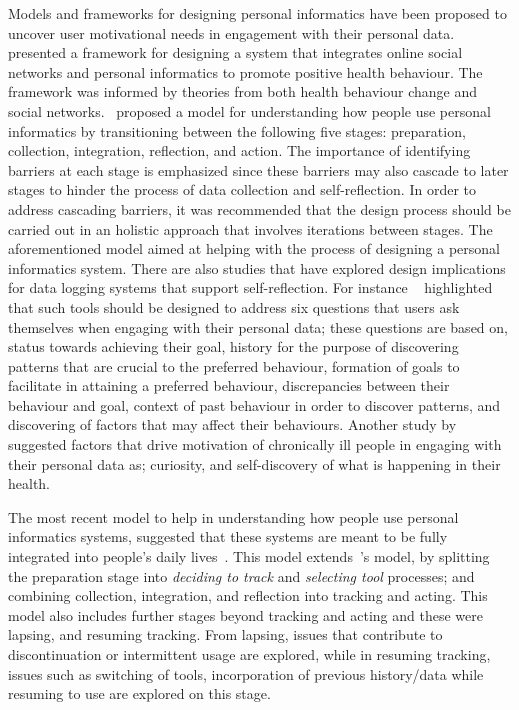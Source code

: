 Models and frameworks for designing personal informatics have been proposed to uncover user motivational needs in engagement with their personal data.~\cite{kamal2010understanding} presented a framework for designing a system that integrates online social networks and personal informatics to promote positive health behaviour. The framework was informed by theories from both health behaviour change and social networks.~\cite{li2010stage} proposed a model for understanding how people use personal informatics by transitioning between the following five stages: preparation, collection, integration, reflection, and action. The importance of identifying barriers at each stage is emphasized since these barriers may also cascade to later stages to hinder the process of data collection and self-reflection. In order to address cascading barriers, it was recommended that the design process should be carried out in an holistic approach that involves iterations between stages. The aforementioned model aimed at helping with the process of designing a personal informatics system. There are also studies that have explored design implications for data logging systems that support self-reflection. For instance ~\cite{li2011understanding} highlighted that such tools should be designed to address six questions that users ask themselves when engaging with their personal data; these questions are based on, status towards achieving their goal, history for the purpose of discovering patterns that are crucial to the preferred behaviour, formation of goals to facilitate in attaining a preferred behaviour, discrepancies between their behaviour and goal, context of past behaviour in order to discover patterns, and discovering of factors that may affect their behaviours. Another study by~\cite{macleod2013personal} suggested factors that drive motivation of chronically ill people in engaging with their personal data as; curiosity, and self-discovery of what is happening in their health.

The most recent model to help in understanding how people use personal informatics systems, suggested that these systems are meant to be fully integrated into people's daily lives~\citep{epstein2015lived}. This model extends~\cite{li2010stage}'s model, by splitting the preparation stage into \emph{deciding to track} and \emph{selecting tool} processes; and combining collection, integration, and reflection into tracking and acting. This model also includes further stages beyond tracking and acting and these were lapsing, and resuming tracking.  From lapsing, issues that contribute to discontinuation or intermittent usage are explored, while in resuming tracking, issues such as switching of tools, incorporation of previous history/data while resuming to use are explored on this stage.  

